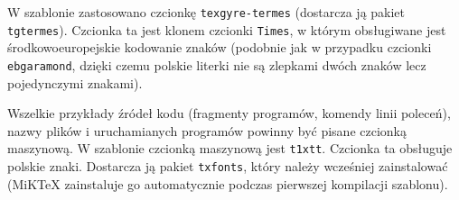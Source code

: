 W szablonie zastosowano czcionkę \texttt{texgyre-termes} (dostarcza ją pakiet \texttt{tgtermes}). Czcionka ta jest klonem czcionki \texttt{Times}, w którym obsługiwane jest środkowoeuropejskie kodowanie znaków (podobnie jak w przypadku czcionki \texttt{ebgaramond}, dzięki czemu polskie literki nie są zlepkami dwóch znaków lecz pojedynczymi znakami).  

Wszelkie przykłady źródeł kodu (fragmenty programów, komendy linii poleceń), nazwy plików i uruchamianych programów powinny być pisane czcionką maszynową. W szablonie czcionką maszynową jest \texttt{t1xtt}. Czcionka ta obsługuje polskie znaki. Dostarcza ją pakiet \texttt{txfonts}, który należy wcześniej zainstalować (MiKTeX zainstaluje go automatycznie podczas pierwszej kompilacji szablonu).   



